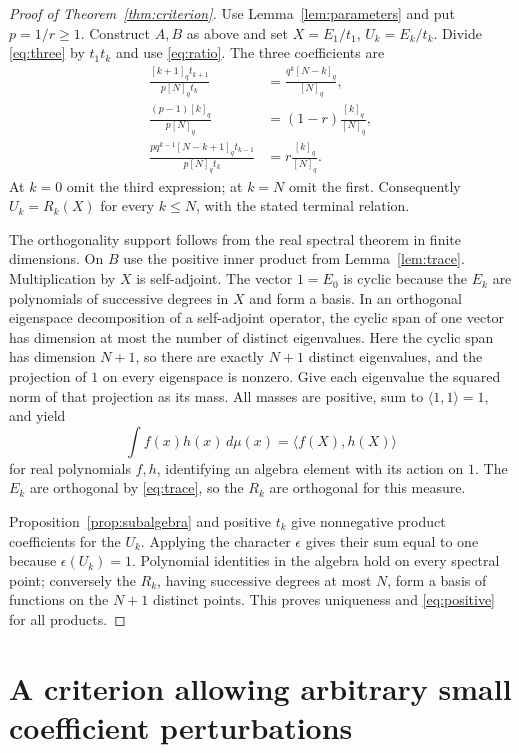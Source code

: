 \documentclass[11pt]{article}
\begin{document}
\begin{proof}[Proof of Theorem~\ref{thm:criterion}]
Use Lemma~\ref{lem:parameters} and put $p=1/r\geq1$. Construct $A,B$ as above and set $X=E_1/t_1$, $U_k=E_k/t_k$. Divide \eqref{eq:three} by $t_1t_k$ and use \eqref{eq:ratio}. The three coefficients are
\begin{align*}
\frac{[k+1]_qt_{k+1}}{p[N]_qt_k}
&=\frac{q^k[N-k]_q}{[N]_q},\\
\frac{(p-1)[k]_q}{p[N]_q}&=(1-r)\frac{[k]_q}{[N]_q},\\
\frac{pq^{k-1}[N-k+1]_qt_{k-1}}{p[N]_qt_k}
&=r\frac{[k]_q}{[N]_q}.
\end{align*}
At $k=0$ omit the third expression; at $k=N$ omit the first. Consequently $U_k=R_k(X)$ for every $k\leq N$, with the stated terminal relation.

The orthogonality support follows from the real spectral theorem in finite dimensions. On $B$ use the positive inner product from Lemma~\ref{lem:trace}. Multiplication by $X$ is self-adjoint. The vector $1=E_0$ is cyclic because the $E_k$ are polynomials of successive degrees in $X$ and form a basis. In an orthogonal eigenspace decomposition of a self-adjoint operator, the cyclic span of one vector has dimension at most the number of distinct eigenvalues. Here the cyclic span has dimension $N+1$, so there are exactly $N+1$ distinct eigenvalues, and the projection of $1$ on every eigenspace is nonzero. Give each eigenvalue the squared norm of that projection as its mass. All masses are positive, sum to $\langle1,1\rangle=1$, and yield
\[
\int f(x)h(x)\,d\mu(x)=\langle f(X),h(X)\rangle
\]
for real polynomials $f,h$, identifying an algebra element with its action on $1$. The $E_k$ are orthogonal by \eqref{eq:trace}, so the $R_k$ are orthogonal for this measure.

Proposition~\ref{prop:subalgebra} and positive $t_k$ give nonnegative product coefficients for the $U_k$. Applying the character $\epsilon$ gives their sum equal to one because $\epsilon(U_k)=1$. Polynomial identities in the algebra hold on every spectral point; conversely the $R_k$, having successive degrees at most $N$, form a basis of functions on the $N+1$ distinct points. This proves uniqueness and \eqref{eq:positive} for all products.
\end{proof}

\section{A criterion allowing arbitrary small coefficient perturbations}
\end{document}
